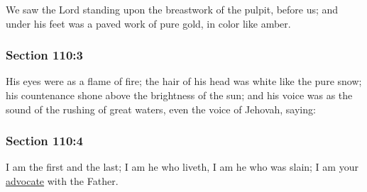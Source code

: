 		We saw the Lord standing upon the breastwork of the pulpit, before us; and under his feet was a paved work of pure gold, in color like amber.


	\subsubsection{Section 110:3} %
		\label{DC110-3}

		His eyes were as a flame of fire; the hair of his head was white like the pure snow; his countenance shone above the brightness of the sun; and his voice was as the sound of the rushing of great waters, even the voice of Jehovah, saying:


	\subsubsection{Section 110:4} %
		\label{DC110-4}

		I am the first and the last; I am he who liveth, I am he who was slain; I am your \hyperref[ADVOCATE]{advocate} with the Father.


